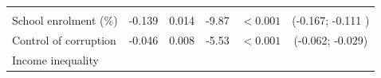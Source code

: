 \documentclass[11pt,a4paper,openany]{book}
\begin{document}
\begin{longtable}[]{@{}lrrrrc@{}}
\begin{minipage}[t]{0.05\columnwidth}
\strut
\end{minipage} & \begin{minipage}[t]{0.07\columnwidth}\raggedleft\strut
\strut
\end{minipage} & \begin{minipage}[t]{0.11\columnwidth}\centering\strut
\strut
\end{minipage}\tabularnewline
\begin{minipage}[t]{0.45\columnwidth}\raggedright\strut
School enrolment (\%)\strut
\end{minipage} & \begin{minipage}[t]{0.08\columnwidth}\raggedleft\strut
-0.139\strut
\end{minipage} & \begin{minipage}[t]{0.06\columnwidth}\raggedleft\strut
0.014\strut
\end{minipage} & \begin{minipage}[t]{0.05\columnwidth}\raggedleft\strut
-9.87\strut
\end{minipage} & \begin{minipage}[t]{0.07\columnwidth}\raggedleft\strut
\(<0.001\)\strut
\end{minipage} & \begin{minipage}[t]{0.11\columnwidth}\centering\strut
(-0.167; -0.111 )\strut
\end{minipage}\tabularnewline
\begin{minipage}[t]{0.45\columnwidth}\raggedright\strut
Control of corruption\strut
\end{minipage} & \begin{minipage}[t]{0.08\columnwidth}\raggedleft\strut
-0.046\strut
\end{minipage} & \begin{minipage}[t]{0.06\columnwidth}\raggedleft\strut
0.008\strut
\end{minipage} & \begin{minipage}[t]{0.05\columnwidth}\raggedleft\strut
-5.53\strut
\end{minipage} & \begin{minipage}[t]{0.07\columnwidth}\raggedleft\strut
\(<0.001\)\strut
\end{minipage} & \begin{minipage}[t]{0.11\columnwidth}\centering\strut
(-0.062; -0.029)\strut
\end{minipage}\tabularnewline
\begin{minipage}[t]{0.45\columnwidth}\raggedright\strut
Income inequality\strut
\end{minipage} & \begin{minipage}[t]{0.08\columnwidth}\raggedleft\strut

\end{minipage}
\end{longtable}
\end{document}
